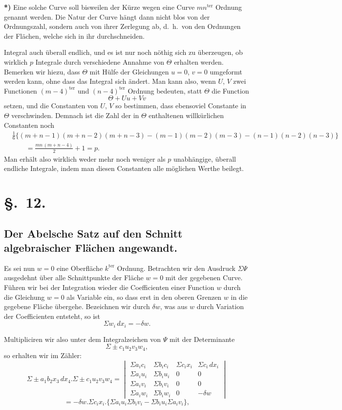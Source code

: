 \documentclass{article}
\begin{document}
\textbf{*)} Eine solche Curve soll bisweilen der Kürze wegen eine Curve $mn^{\text{ter}}$ Ordnung genannt werden. Die Natur der Curve hängt dann nicht blos von der Ordnungszahl, sondern auch von ihrer Zerlegung ab, d.\ h.\ von den Ordnungen der Flächen, welche sich in ihr durchschneiden.


Integral auch überall endlich, und es ist nur noch nöthig sich zu überzeugen, ob wirklich $p$ Integrale durch verschiedene Annahme von $\Theta$ erhalten werden. Bemerken wir hiezu, dass $\Theta$ mit Hülfe der Gleichungen $u=0$, $v=0$ umgeformt werden kann, ohne dass das Integral sich ändert. Man kann also, wenn $U$, $V$ zwei Functionen $(m-4)^{\text{ter}}$ und $(n-4)^{\text{ter}}$ Ordnung bedeuten, statt $\Theta$ die Function
\[
\Theta+Uu+Vv
\]
setzen, und die Constanten von $U$, $V$ so bestimmen, dass ebensoviel Constante in $\Theta$ verschwinden. Demnach ist die Zahl der in $\Theta$ enthaltenen willkürlichen Constanten noch
\[
\begin{aligned}
&\tfrac{1}{6}\{(m+n-1)(m+n-2)(m+n-3)-(m-1)(m-2)(m-3)-(n-1)(n-2)(n-3)\}\\
&\qquad = \frac{mn\,(m+n-4)}{2}+1 = p.
\end{aligned}
\]
Man erhält also wirklich weder mehr noch weniger als $p$ unabhängige, überall endliche Integrale, indem man diesen Constanten alle möglichen Werthe beilegt.

\section*{§.~12.}

\subsection*{Der Abelsche Satz auf den Schnitt algebraischer Flächen angewandt.}

Es sei nun $w=0$ eine Oberfläche $k^{\text{ter}}$ Ordnung. Betrachten wir den Ausdruck $\Sigma\Psi$ ausgedehnt über alle Schnittpunkte der Fläche $w=0$ mit der gegebenen Curve. Führen wir bei der Integration wieder die Coefficienten einer Function $w$ durch die Gleichung $w=0$ als Variable ein, so dass erst in den oberen Grenzen $w$ in die gegebene Fläche übergehe. Bezeichnen wir durch $\delta w$, was aus $w$ durch Variation der Coefficienten entsteht, so ist
\[
\Sigma w_{i}\,dx_{i} = -\delta w.
\]

Multipliciren wir also unter dem Integralzeichen von $\Psi$ mit der Determinante
\[
\Sigma \pm c_{1} u_{2} v_{3} w_{4},
\]
so erhalten wir im Zähler:
\[
\Sigma \pm a_{1} b_{2} x_{3}\,dx_{4}.\Sigma \pm c_{1} u_{2} v_{3} w_{4} =
\begin{vmatrix}
\Sigma a_{i} c_{i} & \Sigma b_{i} c_{i} & \Sigma c_{i} x_{i} & \Sigma c_{i}\,dx_{i}\\
\Sigma a_{i} u_{i} & \Sigma b_{i} u_{i} & 0 & 0\\
\Sigma a_{i} v_{i} & \Sigma b_{i} v_{i} & 0 & 0\\
\Sigma a_{i} w_{i} & \Sigma b_{i} w_{i} & 0 & -\delta w
\end{vmatrix}
\]
\[
= -\delta w.\Sigma c_{i} x_{i}.\{\Sigma a_{i} u_{i} \Sigma b_{i} v_{i} - \Sigma b_{i} u_{i} \Sigma a_{i} v_{i}\},
\]
\end{document}
